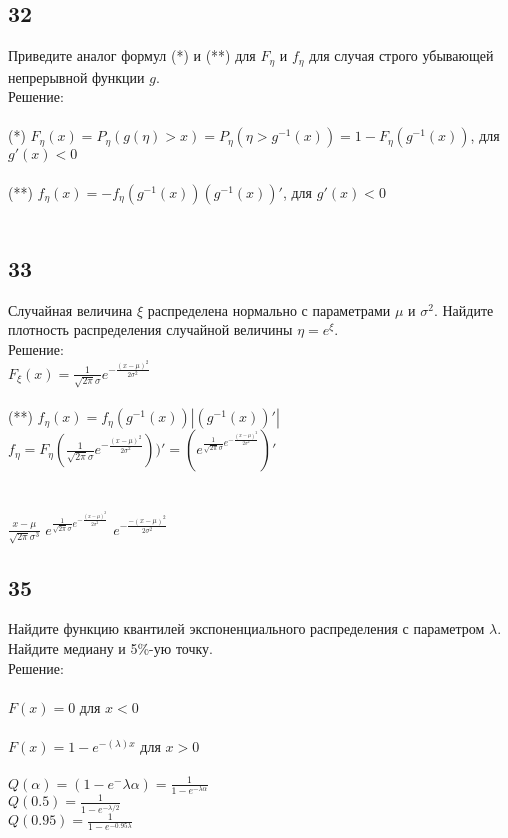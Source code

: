 \documentclass[a4paper, 12pt]{extarticle}
\numberwithin{figure}{section}
\begin{document}
\subsection*{32}
Приведите аналог формул (*) и (**) для $F_\eta$ и $f_\eta$ для случая строго убывающей непрерывной функции $g$.\\

Решение:\\
\\
(*) $F_\eta(x) = P_\eta(g(\eta)>x)=P_\eta(\eta>g^{-1}(x)) = 1 - F_\eta(g^{-1}(x))$, для $g'(x) < 0$\\
\\
(**) $f_\eta(x) = - f_\eta(g^{-1}(x))(g^{-1}(x))'$, для $g'(x) < 0$\\
\\


\subsection*{33}
Случайная величина $\xi$ распределена нормально с параметрами $\mu$ и $\sigma^2$. Найдите плотность распределения случайной величины $\eta = e^\xi$.\\

Решение:\\

$F_\xi(x) = \frac{1}{\sqrt{2\pi}\sigma}e^{-\frac{(x-\mu)^2}{2\sigma^2}}$\\
\\
(**) $f_\eta(x) = f_\eta(g^{-1}(x))|(g^{-1}(x))'|$\\

$f_\eta = F_\eta(\frac{1}{\sqrt{2\pi}\sigma}e^{-\frac{(x-\mu)^2}{2\sigma^2}}))' = (e^{\frac{1}{\sqrt{2\pi}\sigma}e^{-\frac{(x-\mu)^2}{2\sigma^2}}})'$\\
\\
\\
$\frac{x-\mu}{\sqrt{2\pi}\sigma^3}$
$e^{\frac{1}{\sqrt{2\pi}\sigma}e^{-\frac{(x-\mu)^2}{2\sigma^2}}}$
$e^{-\frac{-(x-\mu)^2}{2\sigma^2}}$
\\


\subsection*{35}
Найдите функцию квантилей экспоненциального распределения с параметром $\lambda$.\\
Найдите медиану и 5\%-ую точку.\\

Решение:\\
\\
$F(x)=0$ для $x<0$\\
\\
$F(x)=1-e^{-(\lambda)x}$ для $x>0$\\
\\
$Q(\alpha) = (1-e^-{\lambda\alpha}) = \frac{1}{1-e^{-\lambda\alpha}}$\\
$Q(0.5) = \frac{1}{1-e^{-\lambda/2}}$\\
$Q(0.95) = \frac{1}{1-e^{-0.95\lambda}}$\\
\end{document}
